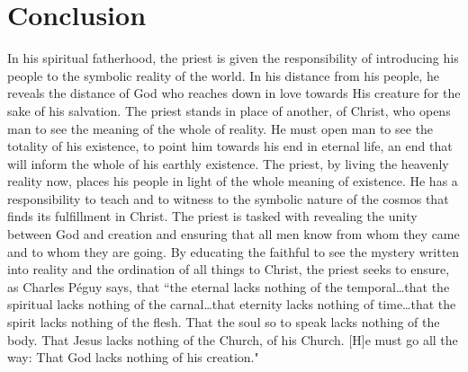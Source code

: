 \documentclass[twoside,10pt]{article}
\begin{document}

\section{Conclusion}

In his spiritual fatherhood, the priest is given the responsibility of introducing his people to the symbolic reality of the world. In his distance from his people, he reveals the distance of God who reaches down in love towards His creature for the sake of his salvation. The priest stands in place of another, of Christ, who opens man to see the meaning of the whole of reality. He must open man to see the totality of his existence, to point him towards his end in eternal life, an end that will inform the whole of his earthly existence. The priest, by living the heavenly reality now, places his people in light of the whole meaning of existence. He has a responsibility to teach and to witness to the symbolic nature of the cosmos that finds its fulfillment in Christ. The priest is tasked with revealing the unity between God and creation and ensuring that all men know from whom they came and to whom they are going. By educating the faithful to see the mystery written into reality and the ordination of all things to Christ, the priest seeks to ensure, as Charles Péguy says, that ``the eternal lacks nothing of the temporal…that the spiritual lacks nothing of the carnal…that eternity lacks nothing of time…that the spirit lacks nothing of the flesh. That the soul so to speak lacks nothing of the body. That Jesus lacks nothing of the Church, of his Church. [H]e must go all the way: That God lacks nothing of his creation."\autocite[66]{peguy}


\newpage
\printbibliography
\end{document}
